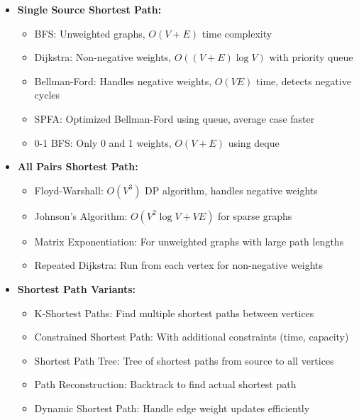 \documentclass[a4paper,10pt]{book}
\begin{document}
\begin{itemize}[leftmargin=*]
    \item \textbf{Single Source Shortest Path:}
    \begin{itemize}
        \item BFS: Unweighted graphs, $O(V + E)$ time complexity
        \item Dijkstra: Non-negative weights, $O((V + E) \log V)$ with priority queue
        \item Bellman-Ford: Handles negative weights, $O(VE)$ time, detects negative cycles
        \item SPFA: Optimized Bellman-Ford using queue, average case faster
        \item 0-1 BFS: Only 0 and 1 weights, $O(V + E)$ using deque
    \end{itemize}

    \item \textbf{All Pairs Shortest Path:}
    \begin{itemize}
        \item Floyd-Warshall: $O(V^3)$ DP algorithm, handles negative weights
        \item Johnson's Algorithm: $O(V^2 \log V + VE)$ for sparse graphs
        \item Matrix Exponentiation: For unweighted graphs with large path lengths
        \item Repeated Dijkstra: Run from each vertex for non-negative weights
    \end{itemize}

    \item \textbf{Shortest Path Variants:}
    \begin{itemize}
        \item K-Shortest Paths: Find multiple shortest paths between vertices
        \item Constrained Shortest Path: With additional constraints (time, capacity)
        \item Shortest Path Tree: Tree of shortest paths from source to all vertices
        \item Path Reconstruction: Backtrack to find actual shortest path
        \item Dynamic Shortest Path: Handle edge weight updates efficiently
    \end{itemize}
\end{itemize}
\end{document}
